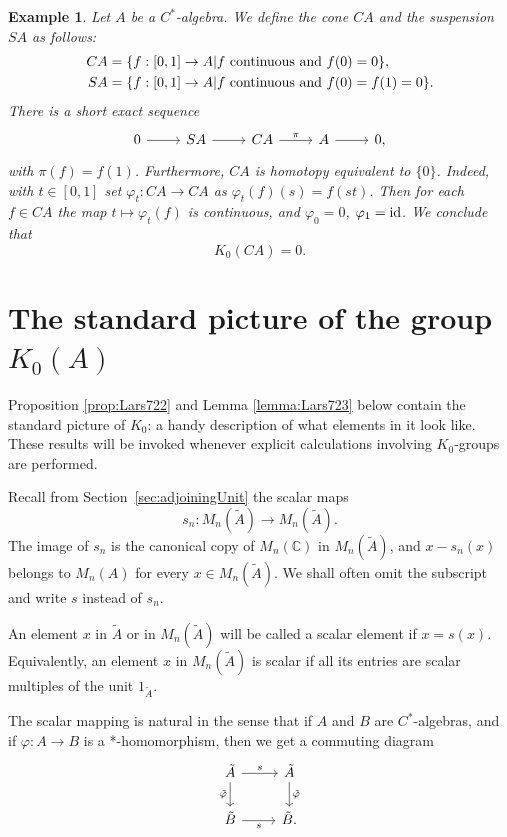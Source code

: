 \documentclass{book}
\newtheorem{example}[definition]{Example}
\def\cstar{\(C^*\)-algebra}
\def\cstars{\(C^*\)-algebras}
\begin{document}
\begin{example}\label{example:449}
  Let \(A\) be a \cstar. We define the \textit{cone} \(CA\) and the \textit{suspension} \(SA\)
  as follows:
  \begin{align*}
    CA &= \{f : [0,1]\rightarrow A| f\textnormal{ continuous and }f(0) = 0\},\\
    SA &= \{f : [0,1] \rightarrow A| f\textnormal{ continuous and }f(0) = f(1) = 0\}.
  \end{align*}
  There is a short exact sequence
  \[
    \begin{tikzcd}
      0 \arrow[r]&S A\arrow[r] & C A \arrow[r,"\pi"]&A\arrow[r]&0,
    \end{tikzcd}
  \]
  with \(\pi(f) = f(1)\). Furthermore, \(C A\) is homotopy equivalent to \(\{0\}\). Indeed, with \(t \in [0,1]\)
  set \(\varphi_t : C A \rightarrow C A\) as \(\varphi_t(f)(s) = f(st)\). Then for each \(f \in C A\) the map \(t \mapsto \varphi_t(f)\) is
  continuous, and \(\varphi_0 = 0\), \(\varphi_1 = \textnormal{id}\). We conclude that
  \[K_0(C A) = 0.\]
\end{example}

\section{The standard picture of the group \texorpdfstring{\(K_0(A)\)}{K0(A)}}
Proposition \ref{prop:Lars722} and Lemma \ref{lemma:Lars723} below contain the standard picture of \(K_0\):
a handy description of what elements in it look like. These results will
be invoked whenever explicit calculations involving \(K_0\)-groups are performed.\par
Recall from Section~\ref{sec:adjoiningUnit} the scalar maps
\[
  s_n:M_n(\tilde{A})\to M_n(\tilde{A}).
\]
The image of \(s_n\) is the canonical copy of \(M_n(\mathbb{C})\) in
\(M_n(\tilde{A})\), and \(x-s_n(x)\) belongs to \(M_n(A)\) for every
\(x\in M_n(\tilde{A})\). We shall often omit the subscript and write \(s\)
instead of \(s_n\).\par
An element \(x\) in \(\tilde{A}\) or in \(M_n(\tilde{A})\) will be called a \textnormal{scalar element} if \(x=s(x)\).
Equivalently, an element \(x\) in \(M_n(\tilde{A})\) is scalar if all its entries are scalar multiples of the unit \(1_{\tilde{A}}\).\par
The scalar mapping is natural in the sense that if \(A\) and \(B\) are \cstars, and if \(\varphi:A\to B\) 
is a *-homomorphism, then we get a commuting diagram
\begin{equation*}
  \begin{tikzcd}
    \tilde{A}\arrow[r,"s"]\arrow[d,"\tilde{\varphi}",swap]&\tilde{A}\arrow[d,"\tilde{\varphi}"]\\
    \tilde{B}\arrow[r,"s",swap]&\tilde{B}.
  \end{tikzcd}
\end{equation*}
\end{document}
